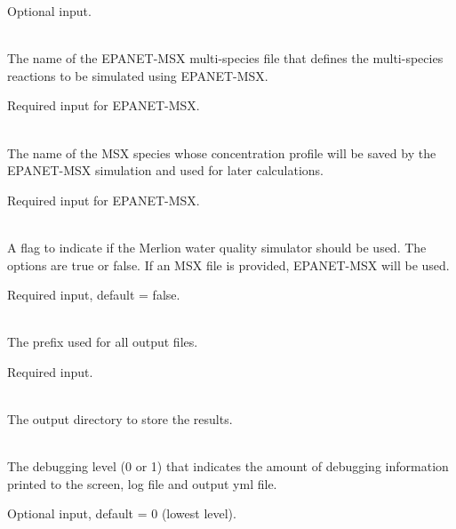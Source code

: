 \begin{description}[topsep=0pt,parsep=0.5em,itemsep=-0.4em]
\begin{description}[topsep=0pt,parsep=0.5em,itemsep=-0.4em]
                Optional input.
    \item[{msx file}]\hfill
\\The name of the EPANET-MSX multi-species file that defines the multi-species reactions to
                be simulated using EPANET-MSX.
                
                Required input for EPANET-MSX.
    \item[{msx species}]\hfill
\\The name of the MSX species whose concentration profile will be saved by the EPANET-MSX simulation
                and used for later calculations.
                
                Required input for EPANET-MSX.
    \item[{merlion}]\hfill
\\A flag to indicate if the Merlion water quality
                simulator should be used. The options are true or false. 
                If an MSX file is provided, EPANET-MSX will be used.
                
                Required input, default = false.
  \end{description}
  \item[{configure}]\hfill
  \begin{description}[topsep=0pt,parsep=0.5em,itemsep=-0.4em]
    \item[{output prefix}]\hfill
\\The prefix used for all output files.
                
                Required input.
    \item[{output directory}]\hfill
      \\The output directory to store the results.
    \item[{debug}]\hfill
\\The debugging level (0 or 1) that indicates the amount of debugging 
                information printed to the screen, log file and output yml file. 
                
                Optional input, default = 0 (lowest level).
  \end{description}
\end{description}
